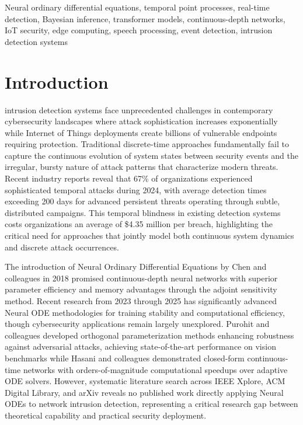 \documentclass[10pt,journal,compsoc]{IEEEtran}
\begin{document}
\begin{IEEEkeywords}
Neural ordinary differential equations, temporal point processes, real-time detection, Bayesian inference, transformer models, continuous-depth networks, IoT security, edge computing, speech processing, event detection, intrusion detection systems
\end{IEEEkeywords}

\IEEEpeerreviewmaketitle

\section{Introduction}
\label{sec:introduction}

 intrusion detection systems face unprecedented challenges in contemporary cybersecurity landscapes where attack sophistication increases exponentially while Internet of Things deployments create billions of vulnerable endpoints requiring protection. Traditional discrete-time approaches fundamentally fail to capture the continuous evolution of system states between security events and the irregular, bursty nature of attack patterns that characterize modern threats. Recent industry reports reveal that 67\% of organizations experienced sophisticated temporal attacks during 2024, with average detection times exceeding 200 days for advanced persistent threats operating through subtle, distributed campaigns. This temporal blindness in existing detection systems costs organizations an average of \$4.35 million per breach, highlighting the critical need for approaches that jointly model both continuous system dynamics and discrete attack occurrences.

The introduction of Neural Ordinary Differential Equations by Chen and colleagues in 2018\cite{chen2018neural} promised continuous-depth neural networks with superior parameter efficiency and memory advantages through the adjoint sensitivity method. Recent research from 2023 through 2025 has significantly advanced Neural ODE methodologies for training stability and computational efficiency, though cybersecurity applications remain largely unexplored\cite{purohit2024ortho,hasani2022liquid}. Purohit and colleagues developed orthogonal parameterization methods enhancing robustness against adversarial attacks, achieving state-of-the-art performance on vision benchmarks while Hasani and colleagues demonstrated closed-form continuous-time networks with orders-of-magnitude computational speedups over adaptive ODE solvers. However, systematic literature search across IEEE Xplore, ACM Digital Library, and arXiv reveals no published work directly applying Neural ODEs to network intrusion detection, representing a critical research gap between theoretical capability and practical security deployment.
\end{document}
